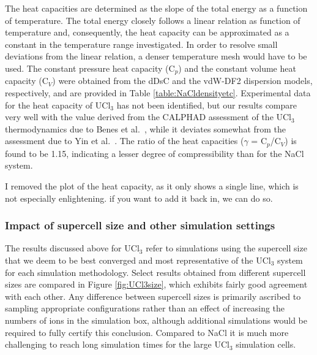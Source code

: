 \documentclass[preprint,3p,10pt,onecolumn,number,sort&compress]{elsarticle}
\begin{document}

The heat capacities are determined as the slope of the total energy as a function of temperature. The total energy closely follows a linear relation as function of temperature and, consequently, the heat capacity can be approximated as a constant in the temperature range investigated. In order to resolve small deviations from the linear relation, a denser temperature mesh would have to be used. The constant pressure heat capacity (C$_p$) and the constant volume heat capacity (C$_V$) were obtained from the dDsC and the vdW-DF2 dispersion models, respectively, and are provided in Table \ref{table:NaCldensityetc}. Experimental data for the heat capacity of UCl$_3$ has not been identified, but our results compare very well with the value derived from the CALPHAD assessment of the UCl$_3$ thermodynamics due to Benes et al.~\cite{BENES2008}, while it deviates somewhat from the assessment due to Yin et al.~\cite{YIN2020}. The ratio of the heat capacities ($\gamma$ = C$_p$/C$_V$) is found to be 1.15, indicating a lesser degree of compressibility than for the NaCl system. 

{\color{red} I removed the plot of the heat capacity, as it only shows a single line, which is not especially enlightening. if you want to add it back in, we can do so.}

\subsubsection{Impact of supercell size and other simulation settings}
The results discussed above for UCl$_3$ refer to simulations using the supercell size that we deem to be best converged and most representative of the UCl$_3$ system for each simulation methodology. Select results obtained from different supercell sizes are compared in Figure \ref{fig:UCl3size}, which exhibits fairly good agreement with each other. Any difference between supercell sizes is primarily ascribed to sampling appropriate configurations rather than an effect of increasing the numbers of ions in the simulation box, although additional simulations would be required to fully certify this conclusion. Compared to NaCl it is much more challenging to reach long simulation times for the large UCl$_3$ simulation cells. 
\end{document}
